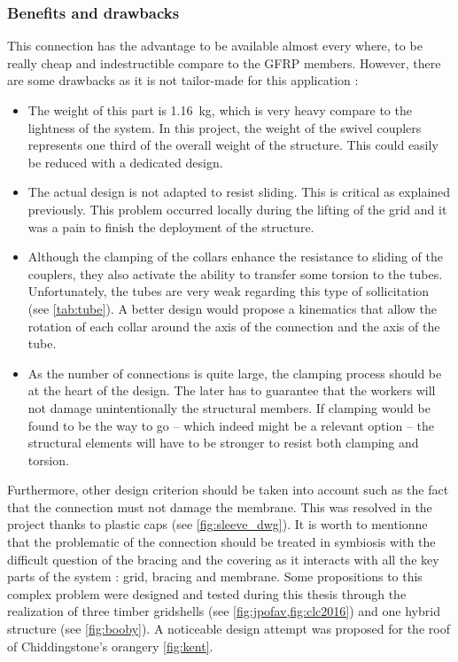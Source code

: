 \subsubsection{Benefits and drawbacks}
This connection has the advantage to be available almost every where, to be really cheap and indestructible compare to the GFRP members. However, there are some drawbacks as it is not tailor-made for this application :
\begin{itemize}
\item The weight of this part is \SI{1.16}{\kg}, which is very heavy compare to the lightness of the system. In this project, the weight of the swivel couplers represents one third of the overall weight of the structure. This could easily be reduced with a dedicated design.
\item The actual design is not adapted to resist sliding. This is critical as explained previously. This problem occurred locally during the lifting of the grid and it was a pain to finish the deployment of the structure.
\item  Although the clamping of the collars enhance the resistance to sliding of the couplers, they also activate the ability to transfer some torsion to the tubes. Unfortunately, the tubes are very weak regarding this type of sollicitation (see \cref{tab:tube}). A better design would propose a kinematics that allow the rotation of each collar around the axis of the connection and the axis of the tube.
\item  As the number of connections is quite large, the clamping process should be at the heart of the design. The later has to guarantee that the workers will not damage unintentionally the structural members. If clamping would be found to be the way to go -- which indeed might be a relevant option -- the structural elements will have to be stronger to resist both clamping and torsion.
\end{itemize}

Furthermore, other design criterion should be taken into account such as the fact that the connection must not damage the membrane. This was resolved in the project thanks to plastic caps (see \cref{fig:sleeve_dwg}). It is worth to mentionne that the problematic of the connection should be treated in symbiosis with the difficult question of the bracing and the covering as it interacts with all the key parts of the system : grid, bracing and membrane. Some propositions to this complex problem were designed and tested during this thesis through the realization of three timber gridshells (see \cref{fig:jpofav,fig:clc2016}) and one hybrid structure (see \cref{fig:booby}). A noticeable design attempt was proposed for the roof of Chiddingstone's orangery \cref{fig:kent}.

